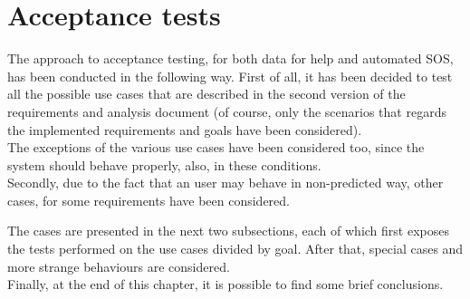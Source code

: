\section{Acceptance tests}
The approach to acceptance testing, for both data for help and automated SOS, has been
conducted in the following way. 
First of all, it has been decided to test all the possible use cases that are described in the
second version of the requirements and analysis document (of course, only the scenarios that
regards the implemented requirements and goals have been considered). \\
The exceptions of the various use cases have been considered too, since the system should
behave properly, also, in these conditions. \\
Secondly, due to the fact that an user may behave in non-predicted way, other cases, for some
requirements have been considered. 

\par
The cases are presented in the next two subsections, each of which first exposes the
tests performed on the use cases divided by goal. After that, special cases and more strange
behaviours are considered. \\
Finally, at the end of this chapter, it is possible to find some brief conclusions. 




